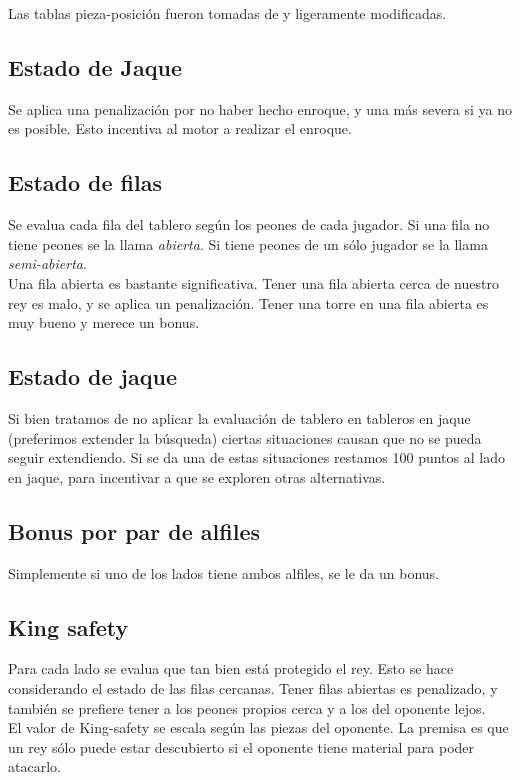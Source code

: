 \documentclass{article}
\begin{document}
\begin{multicols}{2}
Las tablas pieza-posición fueron tomadas de \cite{piece-square-table} y
ligeramente modificadas.

\subsection{Estado de Jaque}
Se aplica una penalización por no haber hecho enroque, y una más severa
si ya no es posible. Esto incentiva al motor a realizar el enroque.

\subsection{Estado de filas}
Se evalua cada fila del tablero según los peones de cada jugador. Si
una fila no tiene peones se la llama \emph{abierta}. Si tiene peones de
un sólo jugador se la llama \emph{semi-abierta}.
\\

Una fila abierta es bastante significativa. Tener una fila abierta cerca
de nuestro rey es malo, y se aplica un penalización. Tener una torre en
una fila abierta es muy bueno y merece un bonus.

\subsection{Estado de jaque}
Si bien tratamos de no aplicar la evaluación de tablero en tableros
en jaque (preferimos extender la búsqueda) ciertas situaciones causan
que no se pueda seguir extendiendo. Si se da una de estas situaciones
restamos 100 puntos al lado en jaque, para incentivar a que se exploren
otras alternativas.

\subsection{Bonus por par de alfiles}
Simplemente si uno de los lados tiene ambos alfiles, se le da un bonus.

\subsection{King safety}
Para cada lado se evalua que tan bien está protegido el rey. Esto se
hace considerando el estado de las filas cercanas. Tener filas abiertas
es penalizado, y también se prefiere tener a los peones propios cerca y
a los del oponente lejos.
\\

El valor de King-safety se escala según las piezas del oponente. La
premisa es que un rey sólo puede estar descubierto si el oponente tiene
material para poder atacarlo.
\\


\end{multicols}
\end{document}
